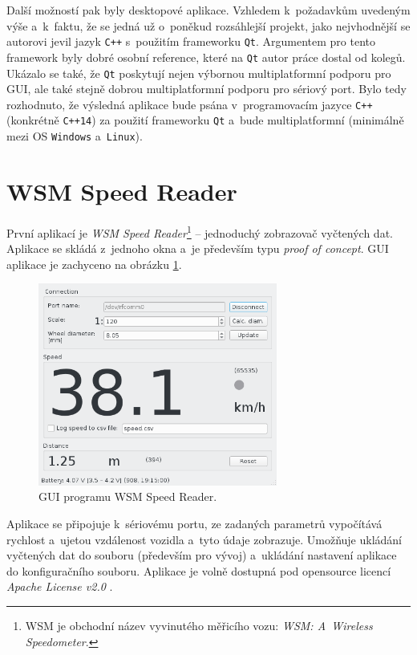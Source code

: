 Další možností pak byly desktopové aplikace. Vzhledem k~požadavkům uvedeným
výše a~k~faktu, že se jedná už o~poněkud rozsáhlejší projekt, jako nejvhodnější
se autorovi jevil jazyk \texttt{C++} s~použitím frameworku \texttt{Qt}.
Argumentem pro tento framework byly dobré osobní reference, které na
\texttt{Qt} autor práce dostal od kolegů. Ukázalo se také, že \texttt{Qt}
poskytují nejen výbornou multiplatformní podporu pro GUI, ale také stejně
dobrou multiplatformní podporu pro sériový port. Bylo tedy rozhodnuto, že
výsledná aplikace bude psána v~programovacím jazyce \texttt{C++} (konkrétně
\texttt{C++14}) za použití frameworku \texttt{Qt} a~bude multiplatformní
(minimálně mezi OS \texttt{Windows} a~\texttt{Linux}).

\section{\gls{WSM} Speed Reader}
\label{sec:sw-wsm-speed-reader}

První aplikací je \textit{\gls{WSM} Speed Reader}\footnote{\gls{WSM} je
obchodní název vyvinutého měřicího vozu: \textit{\gls{WSM}: A~Wireless
Speedometer}.} -- jednoduchý zobrazovač vyčtených dat. Aplikace se skládá
z~jednoho okna a~je především typu \textit{proof of concept}. GUI aplikace je
zachyceno na obrázku
\ref{fig:wsm-speed-reader-gui}.

\begin{figure}[ht]
\includegraphics[width=0.7\textwidth]{data/speed_reader_screenshot.png}
\caption{GUI programu \gls{WSM} Speed Reader.}
\label{fig:wsm-speed-reader-gui}
\end{figure}

Aplikace se připojuje k~sériovému portu, ze zadaných parametrů vypočítává
rychlost a~ujetou vzdálenost vozidla a~tyto údaje zobrazuje. Umožňuje ukládání
vyčtených dat do souboru (především pro vývoj) a~ukládání nastavení aplikace
do konfiguračního souboru. Aplikace je volně dostupná pod opensource licencí
\textit{Apache License v2.0} \cite{wsm-speed-reader}.


